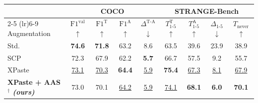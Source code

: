 \begin{tabular}{l cccc cccc}
\toprule
& \multicolumn{4}{c}{\textbf{COCO}} & \multicolumn{4}{c}{\textbf{STRANGE-Bench}} \\
\cmidrule(lr){2-5} \cmidrule(lr){6-9}
Augmentation & $\text{F1}^{\text{val}}$ $\uparrow$ & $\text{F1}^{\text{T}}$ $\uparrow$ & $\text{F1}^{\text{A}}$ $\uparrow$ & $\Delta^{\text{T-A}}$ $\downarrow$ & $T_{1\text{-}5}^{\text{T}}$ $\uparrow$ & $T_{1\text{-}5}^{\text{A}}$ $\uparrow$ & $\Delta_{1\text{-}5}$ $\downarrow$ & $T_{\text{never}}$ $\uparrow$ \\
\midrule
Std. & \textbf{74.6} & \textbf{71.8} & 63.2 & 8.6 & 63.5 & 39.6 & 23.9 & 38.9 \\
SCP & 72.3 & 67.9 & 62.2 & \textbf{5.7} & 66.7 & 57.5 & 9.2 & 55.7 \\
\midrule
XPaste & \underline{73.1} & \underline{70.3} & \textbf{64.4} & \underline{5.9} & \textbf{75.4} & \underline{67.3} & \underline{8.1} & \underline{67.9} \\
\midrule
\rowcolor{oursrow} \textbf{XPaste + AAS$^{\dagger}$ \emph{(ours)}} & 73.0 & 70.1 & \underline{64.2} & \underline{5.9} & \underline{74.1} & \textbf{68.1} & \textbf{6.0} & \textbf{70.1} \\
\bottomrule
\end{tabular}
